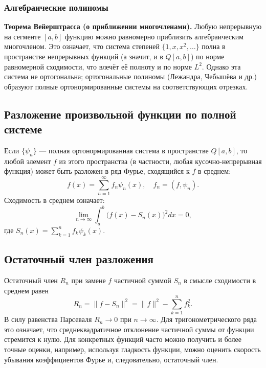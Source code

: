 \documentclass{article}
\theoremstyle{definition}
\begin{document}
\subsubsection{Алгебраические полиномы}
\textbf{Теорема Вейерштрасса (о приближении многочленами).} Любую непрерывную на сегменте $[a,b]$ функцию можно равномерно приблизить алгебраическим многочленом. Это означает, что система степеней $\{1,x,x^2,\dots\}$ полна в пространстве непрерывных функций (а значит, и в $Q[a,b]$) по норме равномерной сходимости, что влечёт её полноту и по норме $L^2$. Однако эта система не ортогональна; ортогональные полиномы (Лежандра, Чебышёва и др.) образуют полные ортонормированные системы на соответствующих отрезках.

\subsection{Разложение произвольной функции по полной системе}
Если $\{\psi_n\}$ — полная ортонормированная система в пространстве $Q[a,b]$, то любой элемент $f$ из этого пространства (в частности, любая кусочно-непрерывная функция) может быть разложен в ряд Фурье, сходящийся к $f$ в среднем:
\[
f(x) = \sum_{n=1}^{\infty} f_n \psi_n(x),\quad f_n = (f,\psi_n).
\]
Сходимость в среднем означает:
\[
\lim_{n\to\infty} \int_a^b \bigl(f(x) - S_n(x)\bigr)^2 dx = 0,
\]
где $S_n(x) = \sum_{k=1}^n f_k\psi_k(x)$.

\subsection{Остаточный член разложения}
Остаточный член $R_n$ при замене $f$ частичной суммой $S_n$ в смысле сходимости в среднем равен
\[
R_n = \|f - S_n\|^2 = \|f\|^2 - \sum_{k=1}^n f_k^2.
\]
В силу равенства Парсеваля $R_n\to0$ при $n\to\infty$. Для тригонометрического ряда это означает, что среднеквадратичное отклонение частичной суммы от функции стремится к нулю. Для конкретных функций часто можно получить и более точные оценки, например, используя гладкость функции, можно оценить скорость убывания коэффициентов Фурье и, следовательно, остаточный член.
\end{document}
